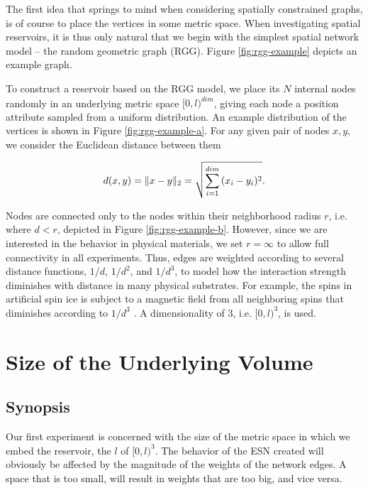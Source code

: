 The first idea that springs to mind when considering spatially constrained
graphs, is of course to place the vertices in some metric space. When
investigating spatial reservoirs, it is thus only natural that we begin with the
simplest spatial network model -- the random geometric graph (RGG). Figure
\ref{fig:rgg-example} depicts an example graph.

To construct a reservoir based on the RGG model, we place its $N$ internal nodes
randomly in an underlying metric space $[0, l)^{dim}$, giving each node a
position attribute sampled from a uniform distribution. An example distribution
of the vertices is shown in Figure \ref{fig:rgg-example-a}. For any given pair
of nodes $x, y$, we consider the Euclidean distance between them

\begin{equation}
  d(x, y) = \Vert x-y \Vert_{2} = \sqrt{\sum_{i=1}^{dim}{(x_{i}-y_{i})^2}}.
  \label{eq:rgg-dist}
\end{equation}

Nodes are connected only to the nodes within their neighborhood radius $r$,
i.e. where $d < r$, depicted in Figure \ref{fig:rgg-example-b}. However, since
we are interested in the behavior in physical materials, we set $r = \infty$ to
allow full connectivity in all experiments. Thus, edges are weighted according
to several distance functions, $1/d$, $1/d^2$, and $1/d^3$, to model how the
interaction strength diminishes with distance in many physical substrates. For
example, the spins in artificial spin ice is subject to a magnetic field from
all neighboring spins that diminishes according to $1/d^3$
\cite{jensen_computation_2018}. A dimensionality of 3, i.e. $[0, l)^{3}$, is
used.

\section{Size of the Underlying Volume}
\label{sec:volume-size}

\subsection{Synopsis}

Our first experiment is concerned with the size of the metric space in which we
embed the reservoir, the $l$ of $[0, l)^3$. The behavior of the ESN created will
obviously be affected by the magnitude of the weights of the network edges. A
space that is too small, will result in weights that are too big, and vice
versa.

